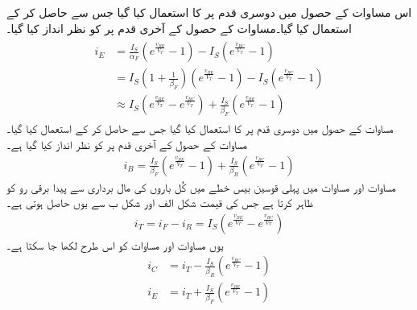 اس مساوات کے حصول میں دوسری قدم پر  کا استعمال کیا گیا جس سے  حاصل کر کے استعمال کیا گیا۔مساوات کے حصول کے آخری قدم پر  کو نظر انداز کیا گیا۔
\begin{gather} \label{مساوات_ٹرانزسٹر_چارجوں_کی_مال_برداری_اور_مخارج_رو}
\begin{aligned}
i_E &=\frac{I_S}{\alpha_F} \left(e^{\frac{v_{BE}}{V_T}}-1 \right )-I_S \left(e^{\frac{v_{BC}}{V_T}}-1 \right )\\
&=I_S \left(1+\frac{1}{\beta_F} \right ) \left(e^{\frac{v_{BE}}{V_T}}-1 \right ) -I_S \left(e^{\frac{v_{BC}}{V_T}}-1 \right )\\
&\approx I_S \left(e^{\frac{v_{BE}}{V_T}}-e^{\frac{v_{BC}}{V_T}} \right ) +\frac{I_S}{\beta_F} \left(e^{\frac{v_{BE}}{V_T}}-1 \right )
\end{aligned}
\end{gather}
مساوات  کے حصول میں دوسری قدم پر  کا استعمال کیا گیا جس سے  حاصل کر کے استعمال کیا گیا۔مساوات کے حصول کے آخری قدم پر  کو نظر انداز کیا گیا ہے۔
\begin{align} \label{مساوات_ٹرانزسٹر_چارجوں_کی_مال_برداری_اور_قابو_رو}
i_B =\frac{I_S}{\beta_F}\left(e^{\frac{v_{BE}}{V_T}}-1 \right ) +\frac{I_S}{\beta_R} \left(e^{\frac{v_{BC}}{V_T}}-1 \right )
\end{align}
مساوات   اور مساوات  میں پہلی  قوسین بیس خطے میں کُل باروں کی مال برداری سے پیدا برقی رو    کو ظاہر کرتا ہے جس کی قیمت شکل  الف اور شکل  ب سے یوں حاصل ہوتی ہے۔
\begin{align}
i_T =i_F-i_R =I_S \left(e^{\frac{v_{BE}}{V_T}}-e^{\frac{v_{BC}}{V_T}} \right )
\end{align}
یوں مساوات  اور مساوات   کو اس طرح لکھا جا سکتا ہے۔
\begin{align}
i_C&=i_T-\frac{I_S}{\beta_R} \left(e^{\frac{v_{BC}}{V_T}}-1 \right )\\
i_E&=i_T+\frac{I_S}{\beta_F} \left(e^{\frac{v_{BE}}{V_T}}-1 \right )
\end{align}


